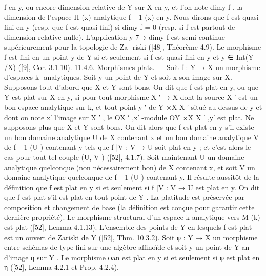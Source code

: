 \documentclass[
  10pt,
]{article}
\newenvironment{Shaded}{}{}
\newcommand{\NormalTok}[1]{#1}
\begin{document}
\begin{Shaded}
\begin{Highlighting}[]
\NormalTok{f en y, ou encore dimension relative de Y sur X en y, et l’on note dimy f , la dimension}
\NormalTok{de l’espace H (x){-}analytique f −1 (x) en y. Nous dirons que f est quasi{-}fini en y (resp.}
\NormalTok{que f est quasi{-}fini) si dimy f = 0 (resp. si f est partout de dimension relative nulle).}
\NormalTok{   L’application y 7→ dimy f est semi{-}continue supérieurement pour la topologie de Za{-}}
\NormalTok{riski ([48], Théorème 4.9).}
\NormalTok{   Le morphisme f est fini en un point y de Y si et seulement si f est quasi{-}fini en y et}
\NormalTok{y ∈ Int(Y /X) ([9], Cor. 3.1.10).}
\NormalTok{11.4.6. Morphismes plats. — Soit f : Y → X un morphisme d’espaces k{-}}
\NormalTok{analytiques. Soit y un point de Y et soit x son image sur X.}
\NormalTok{   Supposons tout d’abord que X et Y sont bons. On dit que f est plat en y, ou que}
\NormalTok{Y est plat sur X en y, si pour tout morphisme X ′ → X dont la source X ′ est un bon}
\NormalTok{espace analytique sur k, et tout point y ′ de Y ×X X ′ situé au{-}dessus de y et dont on}
\NormalTok{note x′ l’image sur X ′ , le OX ′ ,x′ {-}module OY ×X X ′ ,y′ est plat.}
\NormalTok{   Ne supposons plus que X et Y sont bons. On dit alors que f est plat en y s’il existe}
\NormalTok{un bon domaine analytique U de X contenant x et un bon domaine analytique V de}
\NormalTok{f −1 (U ) contenant y tels que f |V : V → U soit plat en y ; et c’est alors le cas pour tout}
\NormalTok{tel couple (U, V ) ([52], 4.1.7).}
\NormalTok{   Soit maintenant U un domaine analytique quelconque (non nécessairement bon) de}
\NormalTok{X contenant x, et soit V un domaine analytique quelconque de f −1 (U ) contenant y. Il}
\NormalTok{résulte aussitôt de la définition que f est plat en y si et seulement si f |V : V → U est}
\NormalTok{plat en y.}
\NormalTok{   On dit que f est plat s’il est plat en tout point de Y . La platitude est préservée par}
\NormalTok{composition et changement de base (la définition est conçue pour garantir cette dernière}
\NormalTok{propriété).}
\NormalTok{   Le morphisme structural d’un espace k{-}analytique vers M (k) est plat ([52], Lemma}
\NormalTok{4.1.13).}
\NormalTok{   L’ensemble des points de Y en lesquels f est plat est un ouvert de Zariski de Y ([52],}
\NormalTok{Thm. 10.3.2).}
\NormalTok{   Soit φ : Y → X un morphisme entre schémas de type fini sur une algèbre affinoïde et}
\NormalTok{soit y un point de Y an d’image η sur Y . Le morphisme φan est plat en y si et seulement}
\NormalTok{si φ est plat en η ([52], Lemma 4.2.1 et Prop. 4.2.4).}



\end{Highlighting}
\end{Shaded}
\end{document}
